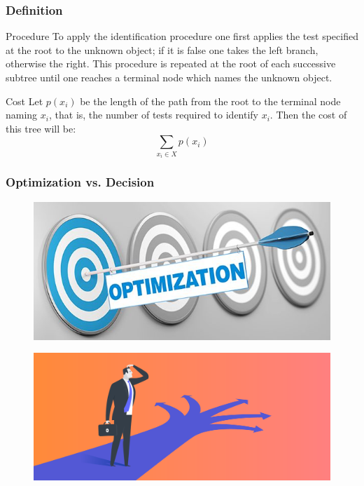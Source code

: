 \documentclass{beamer}
\begin{document}
\begin{frame}[fragile]
\frametitle{Definition}
	\begin{block}{Procedure}
		To apply the identification procedure one first applies the test specified at the root to the unknown object; if it
		is false one takes the left branch, otherwise the right. This procedure is repeated at the root of each successive subtree until one reaches a terminal node which names the unknown object.
	\end{block}

	\begin{block}{Cost}
		Let $p(x_i)$ be the length of the path from the root to the terminal node naming $x_i$, that is, the number of tests
		required to identify $x_i$. Then the cost of this tree will be:
		\[ \sum_{x_i \in X} p(x_i) \]
	\end{block}
\end{frame}

\begin{frame}
	\frametitle{Optimization vs. Decision}
	\begin{figure}
		\includegraphics[height=0.33\textheight]{Pics/opt.jpg}
	\end{figure}
	
	\begin{figure}
		\includegraphics[height=0.3\textheight]{Pics/decision.png}
	\end{figure}
\end{frame}
\end{document}
